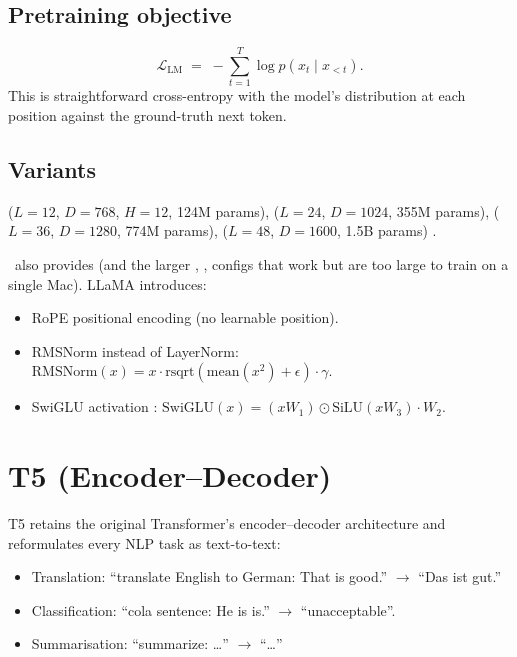 \subsection{Pretraining objective}
\label{ssec:language_models:gpt_pretrain}

\[
  \mathcal{L}_{\text{LM}} \;=\; -\sum_{t=1}^T \log p(x_t \mid x_{<t}).
\]
This is straightforward cross-entropy with the model's
distribution at each position against the ground-truth next
token.

\subsection{Variants}
\label{ssec:language_models:gpt_variants}

 ($L = 12$, $D = 768$, $H = 12$, 124M params),
 ($L = 24$, $D = 1024$, 355M params),
 ($L = 36$, $D = 1280$, 774M params),
 ($L = 48$, $D = 1600$, 1.5B params)
\cite{radford_gpt2_2019}.

\Lucid\ also provides  (and the
larger , , 
configs that work but are too large to train on a single Mac).
LLaMA \cite{touvron_llama_2023} introduces:
\begin{itemize}
  \item RoPE positional encoding (no learnable position).
  \item RMSNorm \cite{zhang_rmsnorm_2019} instead of LayerNorm:
    $\mathrm{RMSNorm}(x) = x \cdot \mathrm{rsqrt}(\mathrm{mean}(x^2) + \epsilon) \cdot \gamma$.
  \item SwiGLU activation \cite{shazeer_glu_2020}:
    $\mathrm{SwiGLU}(x) = (x W_1) \odot \mathrm{SiLU}(x W_3) \cdot W_2$.
\end{itemize}

\section{T5 (Encoder--Decoder)}
\label{sec:language_models:t5}

T5 \cite{raffel_t5_2020} retains the original Transformer's
encoder--decoder architecture and reformulates every NLP task
as text-to-text:
\begin{itemize}
  \item Translation: ``translate English to German: That is
    good.'' $\to$ ``Das ist gut.''
  \item Classification: ``cola sentence: He is is.'' $\to$
    ``unacceptable''.
  \item Summarisation: ``summarize: \ldots'' $\to$ ``\ldots''
\end{itemize}

